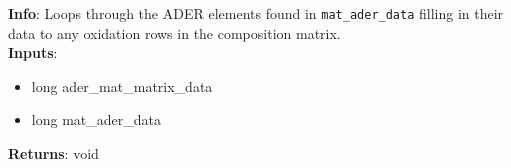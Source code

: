 \textbf{Info}: Loops through the ADER elements found in \texttt{mat\_ader\_data}
filling in their data to any oxidation rows in the composition matrix.\\

\noindent \textbf{Inputs}:
\begin{itemize}
\item{long ader\_mat\_matrix\_data}
\item{long mat\_ader\_data}
\end{itemize}

\noindent \textbf{Returns}: void
